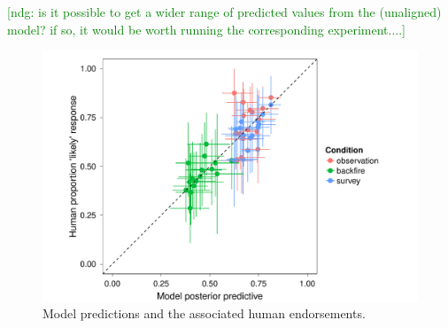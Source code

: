 \documentclass[10pt,letterpaper]{article}
\newcommand{\red}[1]{\textcolor{Red}{#1}}
\newcommand{\ndg}[1]{\textcolor{Green}{[ndg: #1]}}
\begin{document}
\ndg{is it possible to get a wider range of predicted values from the (unaligned) model? if so, it would be worth running the corresponding experiment....}

\begin{figure}
    \includegraphics[width=\columnwidth]{scatter}
    \caption{Model predictions and the associated human endorsements.}
  \label{fig:scatter}
\end{figure}



\end{document}
